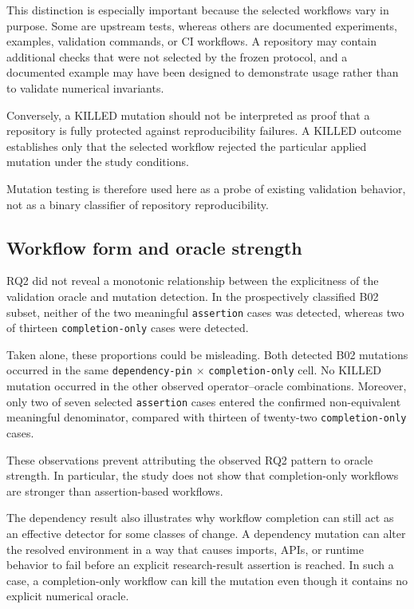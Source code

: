 This distinction is especially important because the selected workflows vary in
purpose. Some are upstream tests, whereas others are documented experiments,
examples, validation commands, or CI workflows. A repository may contain
additional checks that were not selected by the frozen protocol, and a
documented example may have been designed to demonstrate usage rather than to
validate numerical invariants.

Conversely, a KILLED mutation should not be interpreted as proof that a
repository is fully protected against reproducibility failures. A KILLED
outcome establishes only that the selected workflow rejected the particular
applied mutation under the study conditions.

Mutation testing is therefore used here as a probe of existing validation
behavior, not as a binary classifier of repository reproducibility.


\subsection{Workflow form and oracle strength}
\label{sec:discussion-oracles}

RQ2 did not reveal a monotonic relationship between the explicitness of the
validation oracle and mutation detection. In the prospectively classified B02
subset, neither of the two meaningful \texttt{assertion} cases was detected,
whereas two of thirteen \texttt{completion-only} cases were detected.

Taken alone, these proportions could be misleading. Both detected B02
mutations occurred in the same
\texttt{dependency-pin} $\times$ \texttt{completion-only} cell. No KILLED
mutation occurred in the other observed operator--oracle combinations.
Moreover, only two of seven selected \texttt{assertion} cases entered the
confirmed non-equivalent meaningful denominator, compared with thirteen of
twenty-two \texttt{completion-only} cases.

These observations prevent attributing the observed RQ2 pattern to oracle
strength. In particular, the study does not show that completion-only workflows
are stronger than assertion-based workflows.

The dependency result also illustrates why workflow completion can still act
as an effective detector for some classes of change. A dependency mutation can
alter the resolved environment in a way that causes imports, APIs, or runtime
behavior to fail before an explicit research-result assertion is reached. In
such a case, a completion-only workflow can kill the mutation even though it
contains no explicit numerical oracle.

